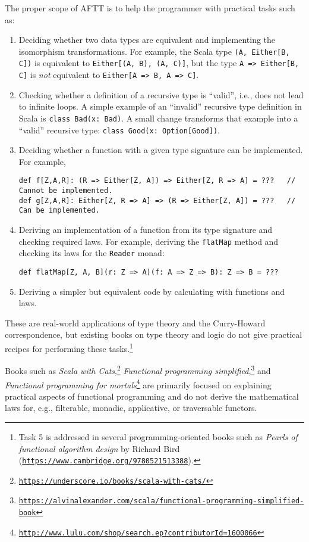 The proper scope of AFTT is to help the programmer with practical
tasks such as:
\begin{enumerate}
\item Deciding whether two data types are equivalent and implementing the
isomorphism transformations. For example, the Scala type \lstinline!(A, Either[B, C])!
is equivalent to \lstinline!Either[(A, B), (A, C)]!, but the type
\lstinline!A => Either[B, C]! is \emph{not} equivalent to \lstinline!Either[A => B, A => C]!.
\item Checking whether a definition of a recursive type is \textsf{``}valid\textsf{''},
i.e., does not lead to infinite loops. A simple example of an \textsf{``}invalid\textsf{''}
recursive type definition in Scala is \lstinline!class Bad(x: Bad)!.
A small change transforms that example into a \textsf{``}valid\textsf{''} recursive
type: \lstinline!class Good(x: Option[Good])!.
\item Deciding whether a function with a given type signature can be implemented.
For example, 
\begin{lstlisting}
def f[Z,A,R]: (R => Either[Z, A]) => Either[Z, R => A] = ???   // Cannot be implemented.
def g[Z,A,R]: Either[Z, R => A] => (R => Either[Z, A]) = ???   // Can be implemented.
\end{lstlisting}
\item Deriving an implementation of a function from its type signature and
checking required laws. For example, deriving the \lstinline!flatMap!
method and checking its laws for the \lstinline!Reader! monad:
\begin{lstlisting}
def flatMap[Z, A, B](r: Z => A)(f: A => Z => B): Z => B = ???
\end{lstlisting}
\item Deriving a simpler but equivalent code by calculating with functions
and laws.
\end{enumerate}
These are real-world applications of type theory and the Curry-Howard
correspondence, but existing books on type theory and logic do not
give practical recipes for performing these tasks.\footnote{Task 5 is addressed in several programming-oriented books such as
\emph{Pearls of functional algorithm design} by Richard
Bird (\texttt{\href{https://www.cambridge.org/9780521513388}{https://www.cambridge.org/9780521513388}}).}

Books such as \emph{Scala with Cats},\footnote{\texttt{\href{https://underscore.io/books/scala-with-cats/}{https://underscore.io/books/scala-with-cats/}}}
\emph{Functional programming simplified},\footnote{\texttt{\href{https://alvinalexander.com/scala/functional-programming-simplified-book}{https://alvinalexander.com/scala/functional-programming-simplified-book}}}
and \emph{Functional programming for mortals}\footnote{\texttt{\href{http://www.lulu.com/shop/search.ep?contributorId=1600066}{http://www.lulu.com/shop/search.ep?contributorId=1600066}}}
are primarily focused on explaining practical aspects of functional
programming and do not derive the mathematical laws for, e.g., filterable,
monadic, applicative, or traversable functors.

